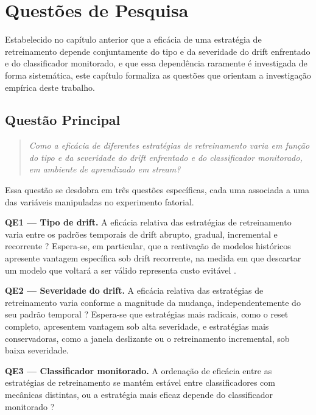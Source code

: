 \chapter{Questões de Pesquisa}
\label{chap:questoes}

Estabelecido no capítulo anterior que a eficácia de uma estratégia de
retreinamento depende conjuntamente do tipo e da severidade do drift
enfrentado e do classificador monitorado, e que essa dependência raramente é
investigada de forma sistemática, este capítulo formaliza as questões que
orientam a investigação empírica deste trabalho.

\section{Questão Principal}

\begin{quote}
\textit{Como a eficácia de diferentes estratégias de retreinamento varia em
função do tipo e da severidade do drift enfrentado e do classificador
monitorado, em ambiente de aprendizado em stream?}
\end{quote}

Essa questão se desdobra em três questões específicas, cada uma associada a
uma das variáveis manipuladas no experimento fatorial.

\textbf{QE1 — Tipo de drift.} A eficácia relativa das estratégias de
retreinamento varia entre os padrões temporais de drift abrupto, gradual,
incremental e recorrente \cite{gama2014,lu2018}? Espera-se, em particular,
que a reativação de modelos históricos apresente vantagem específica sob
drift recorrente, na medida em que descartar um modelo que voltará a ser
válido representa custo evitável \cite{sun2018,li2021}.

\textbf{QE2 — Severidade do drift.} A eficácia relativa das estratégias de
retreinamento varia conforme a magnitude da mudança, independentemente do seu
padrão temporal \cite{wang2022elastic,wang2024quadcdd}? Espera-se que
estratégias mais radicais, como o reset completo, apresentem vantagem sob
alta severidade, e estratégias mais conservadoras, como a janela deslizante
ou o retreinamento incremental, sob baixa severidade.

\textbf{QE3 — Classificador monitorado.} A ordenação de eficácia entre as
estratégias de retreinamento se mantém estável entre classificadores com
mecânicas distintas, ou a estratégia mais eficaz depende do classificador
monitorado \cite{webb2016,wang2022dynamic}?

